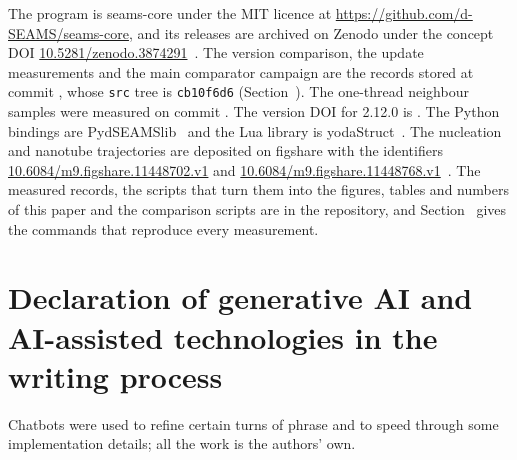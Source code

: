 \documentclass[preprint,12pt]{elsarticle}
\begin{document}
The program is seams-core under the MIT licence at \url{https://github.com/d-SEAMS/seams-core}, and its releases are archived on Zenodo under the concept DOI \href{https://doi.org/10.5281/zenodo.3874291}{10.5281/zenodo.3874291}~\cite{seamscore2026}.
The version comparison, the update measurements and the main comparator campaign are the records stored at commit \texttt{}, whose \texttt{src} tree is \texttt{cb10f6d6} (Section~).
The one-thread neighbour samples were measured on commit \texttt{}.
The version DOI for 2.12.0 is \DOIPENDING.
The Python bindings are PydSEAMSlib~\cite{pydseamslib2026} and the Lua library is yodaStruct~\cite{yodastruct2026}.
The nucleation and nanotube trajectories are deposited on figshare with the identifiers \href{https://doi.org/10.6084/m9.figshare.11448702.v1}{10.6084/m9.figshare.11448702.v1} and \href{https://doi.org/10.6084/m9.figshare.11448768.v1}{10.6084/m9.figshare.11448768.v1}~\cite{goswami2019nucleationdata,goswami2019nanotubedata}.
The measured records, the scripts that turn them into the figures, tables and numbers of this paper and the comparison scripts are in the repository, and Section~ gives the commands that reproduce every measurement.

\section*{Declaration of generative AI and AI-assisted technologies in the writing process}

Chatbots were used to refine certain turns of phrase and to speed through some implementation details; all the work is the authors' own.

 
\end{document}
